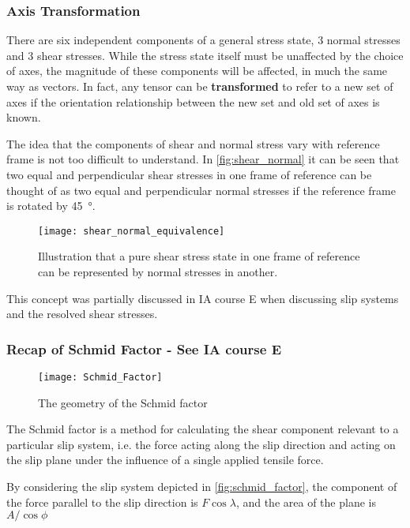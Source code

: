 \subsubsection{Axis Transformation}


There are six independent components of a general stress state, 3 normal stresses and 3 shear stresses. While the stress state itself must be unaffected by the choice of axes, the magnitude of these components will be affected, in much the same way as vectors. In fact, any tensor can be {\bf transformed} to refer to a new set of axes if the orientation relationship between the new set and old set of axes is known. 


The idea that the components of shear and normal stress vary with reference frame is not too difficult to understand. In \autoref{fig:shear_normal} it can be seen that two equal and perpendicular shear stresses in one frame of reference can be thought of as two equal and perpendicular normal stresses if the reference frame is rotated by \SI{45}{\degree}.


\begin{figure}[h!]
\centering
\texttt{[image: shear\_normal\_equivalence]}
\caption{Illustration that a pure shear stress state in one frame of reference can be represented by normal stresses in another.\label{fig:shear_normal}}
\end{figure}


This concept was partially discussed in IA course E when discussing slip systems and the resolved shear stresses.

\subsubsection*{Recap of Schmid Factor - See IA course E}


\begin{figure}[h!]
\centering
\texttt{[image: Schmid\_Factor]}
\caption{The geometry of the Schmid factor\label{fig:schmid_factor}}
\end{figure}

The Schmid factor is a method for calculating the shear component relevant to a particular slip system, i.e. the force acting along the slip direction and acting on the slip plane under the influence of a single applied tensile force.

By considering the slip system depicted in \autoref{fig:schmid_factor}, the component of the force parallel to the slip direction is $F\cos\lambda$, and the area of the plane is $A/\!\cos\phi$


